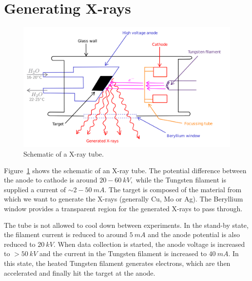 \section{Generating X-rays}

\begin{figure}
	\centering
	\includegraphics[scale=0.14]{xray_tube.png}
	\caption{\label{fig:xray_tube}Schematic of a X-ray tube.}
\end{figure}

	Figure~\ref{fig:xray_tube} shows the schematic of an X-ray tube. The potential difference between the anode to cathode is around $20-60~\si{kV},$ while the Tungsten filament is supplied a current of $\sim 2-50~\si{mA}.$ The target is composed of the material from which we want to generate the X-rays (generally Cu, Mo or Ag). The Beryllium window provides a transparent region for the generated X-rays to pass through.
	
	The tube is not allowed to cool down between experiments. In the stand-by state, the filament current is reduced to around $\SI{5}{mA}$ and the anode potential is also reduced to $\SI{20}{kV}.$ When data collection is started, the anode voltage is increased to $>\SI{50}{kV}$ and the current in the Tungsten filament is increased to $\SI{40}{mA}.$ In this state, the heated Tungsten filament generates electrons, which are then accelerated and finally hit the target at the anode.

